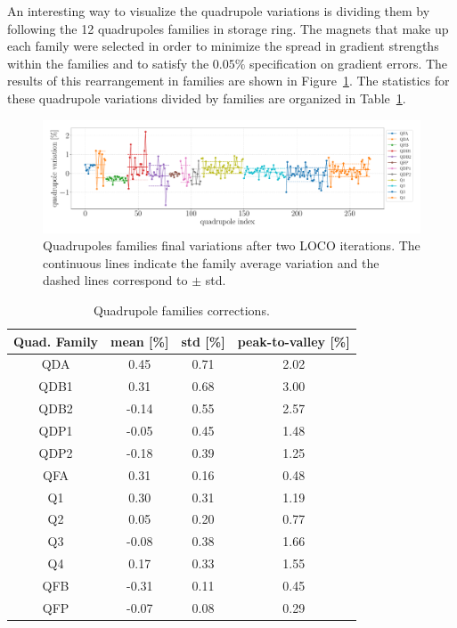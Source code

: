 An interesting way to visualize the quadrupole variations is dividing them by following the 12 quadrupoles families in storage ring. The magnets that make up each family were selected in order to minimize the spread in gradient strengths within the families and to satisfy the $0.05\%$ specification on gradient errors. The results of this rearrangement in families are shown in Figure~\ref{fig:loco_corrections_final_families}. The statistics for these quadrupole variations divided by families are organized in Table~\ref{tab:quad_fam_corr}.
\begin{figure}
\centering
\includegraphics[width=1.0\textwidth]{figures/final_quads_correction_families_fix.pdf}
\caption{Quadrupoles families final variations after two LOCO iterations. The continuous lines indicate the family average variation and the dashed lines correspond to $\pm$ std.}
\label{fig:loco_corrections_final_families}
\end{figure}
\begin{table}
    \centering
    \caption{Quadrupole families corrections.}
    \label{tab:quad_fam_corr}
    \begin{tabular}{cccc}
        \toprule\toprule
        Quad. Family & mean [\%] & std [\%] & peak-to-valley [\%] \\
        \hline
        QDA  &  0.45  & 0.71 & 2.02 \\
        QDB1 &  0.31  & 0.68 & 3.00 \\
        QDB2 &  -0.14 &  0.55&  2.57 \\
        QDP1 &  -0.05 &  0.45 &  1.48 \\
        QDP2 &  -0.18 &  0.39 &  1.25 \\
        \hline
        QFA  &  0.31  & 0.16 & 0.48 \\
        Q1   &  0.30  & 0.31 & 1.19 \\
        Q2   &  0.05  & 0.20 & 0.77 \\
        Q3   &  -0.08 &  0.38 &  1.66 \\
        Q4   &  0.17  & 0.33 & 1.55 \\
        \hline
        QFB  &  -0.31 & 0.11 &  0.45 \\
        QFP  &  -0.07 &  0.08 &   0.29 \\
        \bottomrule\bottomrule
    \end{tabular}
\end{table}

